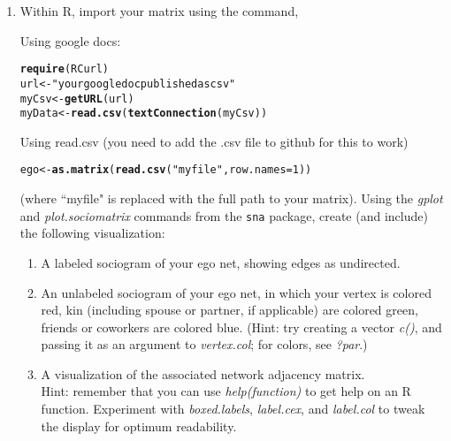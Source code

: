 \documentclass[11pt, oneside]{article}\usepackage[]{graphicx}\usepackage[]{color}
\makeatletter
\newcommand{\hlnum}[1]{\textcolor[rgb]{0.686,0.059,0.569}{#1}}%
\newcommand{\hlstr}[1]{\textcolor[rgb]{0.192,0.494,0.8}{#1}}%
\newcommand{\hlstd}[1]{\textcolor[rgb]{0.345,0.345,0.345}{#1}}%
\newcommand{\hlkwb}[1]{\textcolor[rgb]{0.69,0.353,0.396}{#1}}%
\newcommand{\hlkwc}[1]{\textcolor[rgb]{0.333,0.667,0.333}{#1}}%
\newcommand{\hlkwd}[1]{\textcolor[rgb]{0.737,0.353,0.396}{\textbf{#1}}}%
\newenvironment{kframe}{%
 \def\at@end@of@kframe{}%
 \ifinner\ifhmode%
  \def\at@end@of@kframe{\end{minipage}}%
  \begin{minipage}{\columnwidth}%
 \fi\fi%
 \def\FrameCommand##1{\hskip\@totalleftmargin \hskip-\fboxsep
 \colorbox{shadecolor}{##1}\hskip-\fboxsep
     \hskip-\linewidth \hskip-\@totalleftmargin \hskip\columnwidth}%
 \MakeFramed {\advance\hsize-\width
   \@totalleftmargin\z@ \linewidth\hsize
   \@setminipage}}%
 {\par\unskip\endMakeFramed%
 \at@end@of@kframe}
\newenvironment{knitrout}{}{} %
\newenvironment{prob}[2][Problem]{\begin{trivlist}
\item[\hskip \labelsep {\bfseries #1}\hskip \labelsep {\bfseries #2.}]}{\end{trivlist}}
\makeatother
\begin{document}
\begin{prob}{1}
\begin{enumerate}
\item Within R, import your matrix using the command,

Using google docs:
\begin{knitrout}
\color{fgcolor}\begin{kframe}
\begin{alltt}
\hlkwd{require}\hlstd{(RCurl)}
\hlstd{url} \hlkwb{<-} \hlstr{"yourgoogledocpublishedascsv"}
\hlstd{myCsv} \hlkwb{<-} \hlkwd{getURL}\hlstd{(url)}
\hlstd{myData} \hlkwb{<-} \hlkwd{read.csv}\hlstd{(}\hlkwd{textConnection}\hlstd{(myCsv))}
\end{alltt}
\end{kframe}
\end{knitrout}

Using read.csv (you need to add the .csv file to github for this to work)
\begin{knitrout}
\color{fgcolor}\begin{kframe}
\begin{alltt}
\hlstd{ego} \hlkwb{<-} \hlkwd{as.matrix}\hlstd{(}\hlkwd{read.csv}\hlstd{(}\hlstr{"myfile"}\hlstd{,} \hlkwc{row.names} \hlstd{=} \hlnum{1}\hlstd{))}
\end{alltt}
\end{kframe}
\end{knitrout}

\noindent
(where ``myfile" is replaced with the full path to your matrix). Using the \emph{gplot} and \emph{plot.sociomatrix} commands from the {\tt sna} package, create (and include) the following visualization:
\begin{enumerate}
\item A labeled sociogram of your ego net, showing edges as undirected.
\item An unlabeled sociogram of your ego net, in which your vertex is colored red, kin (including spouse or partner, if applicable) are colored green, friends or coworkers are colored blue. (Hint: try creating a vector \emph{c()}, and passing it as an argument to \emph{vertex.col}; for colors, see \emph{?par}.)
\item A visualization of the associated network adjacency matrix. \\

\noindent
Hint: remember that you can use \emph{help(function)} to get help on an R function. Experiment with \emph{boxed.labels}, \emph{label.cex}, and \emph{label.col} to tweak the display for optimum readability.
\end{enumerate}


\end{enumerate}
\end{prob}
\end{document}
